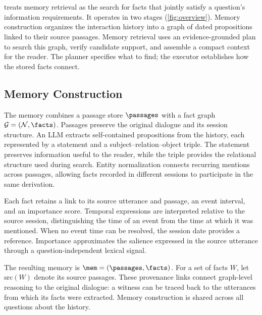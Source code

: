 \section{\texorpdfstring{\sys}{WitnessRAG}}
\label{sec:method}

\sys treats memory retrieval as the search for facts that jointly satisfy
a question's information requirements. It operates in two stages
(\cref{fig:overview}). Memory construction organizes the interaction
history into a graph of dated propositions linked to their source
passages. Memory retrieval uses an evidence-grounded plan to search this
graph, verify candidate support, and assemble a compact context for the
reader. The planner specifies what to find; the executor establishes how
the stored facts connect.



\subsection{Memory Construction}
\label{sec:method-register}

The memory combines a passage store $\passages$ with a fact graph
$\mathcal G=(\mathcal N,\facts)$. Passages preserve the original dialogue
and its session structure. An \ac{LLM} extracts self-contained
propositions from the history, each represented by a statement and a
subject--relation--object triple. The statement preserves information
useful to the reader, while the triple provides the relational structure
used during search. Entity normalization connects recurring mentions
across passages, allowing facts recorded in different sessions to
participate in the same derivation.

Each fact retains a link to its source utterance and passage, an event
interval, and an importance score. Temporal expressions are interpreted
relative to the source session, distinguishing the time of an event
from the time at which it was mentioned. When no event time can be
resolved, the session date provides a reference. Importance approximates
the salience expressed in the source utterance through a
question-independent lexical signal.

The resulting memory is $\mem=(\passages,\facts)$. For a set of facts
$W$, let $\mathrm{src}(W)$ denote its source passages. These provenance
links connect graph-level reasoning to the original dialogue: a witness
can be traced back to the utterances from which its facts were extracted.
Memory construction is shared across all questions about the history.

